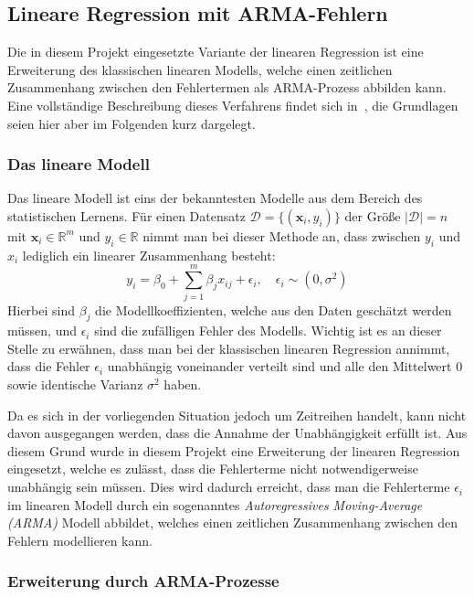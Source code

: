 \subsection{Lineare Regression mit ARMA-Fehlern}
\label{sec:arma}

Die in diesem Projekt eingesetzte Variante der linearen Regression ist eine Erweiterung des klassischen linearen Modells,
welche einen zeitlichen Zusammenhang zwischen den Fehlertermen als ARMA-Prozess abbilden kann.
Eine vollst\"andige Beschreibung dieses Verfahrens findet sich in~\cite{forecasting},
die Grundlagen seien hier aber im Folgenden kurz dargelegt.

\subsubsection{Das lineare Modell}

Das lineare Modell ist eins der bekanntesten Modelle aus dem Bereich des statistischen Lernens.
F\"ur einen Datensatz $\mathcal{D} = \{(\mathbf{x}_i, y_i)\}$ der Gr\"o{\ss}e $\left| \mathcal{D} \right| = n$
mit $\mathbf{x}_i \in \mathbb{R}^m$ und $y_i \in \mathbb{R}$
nimmt man bei dieser Methode an, dass zwischen $y_i$ und $x_i$ lediglich ein linearer Zusammenhang besteht:
\begin{equation}
    y_i = \beta_0 + \sum_{j=1}^m \beta_j x_{ij} + \epsilon_i, \quad \epsilon_i \sim (0, \sigma^2)
\end{equation}
Hierbei sind $\beta_j$ die Modellkoeffizienten, welche aus den Daten gesch\"atzt werden m\"ussen, und $\epsilon_i$ sind die
zuf\"alligen Fehler des Modells.
Wichtig ist es an dieser Stelle zu erw\"ahnen, dass man bei der klassischen linearen Regression annimmt, dass die Fehler $\epsilon_i$
unabh\"angig voneinander verteilt sind und alle den Mittelwert 0 sowie identische Varianz $\sigma^2$ haben.

Da es sich in der vorliegenden Situation jedoch um Zeitreihen handelt, kann nicht davon ausgegangen werden, dass die Annahme der
Unabh\"angigkeit erf\"ullt ist.
Aus diesem Grund wurde in diesem Projekt eine Erweiterung der linearen Regression eingesetzt, welche es zul\"asst, dass die
Fehlerterme nicht notwendigerweise unabh\"angig sein m\"ussen.
Dies wird dadurch erreicht, dass man die Fehlerterme $\epsilon_i$ im linearen Modell durch ein sogenanntes
\textit{Autoregressives Moving-Average (ARMA)} Modell abbildet, welches einen zeitlichen Zusammenhang zwischen
den Fehlern modellieren kann.

\subsubsection{Erweiterung durch ARMA-Prozesse}

